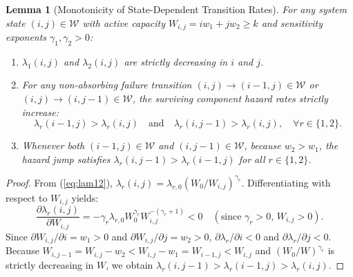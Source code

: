 \documentclass[10pt,a4paper]{article}
\newtheorem{lemma}{Lemma}
\begin{document}
\begin{lemma}[Monotonicity of State-Dependent Transition Rates]
For any system state $(i, j) \in \mathcal{W}$ with active capacity $W_{i,j} = i w_1 + j w_2 \ge k$ and sensitivity exponents $\gamma_1, \gamma_2 > 0$:
\begin{enumerate}
    \item $\lambda_1(i, j)$ and $\lambda_2(i, j)$ are strictly decreasing in $i$ and $j$.
    \item For any non-absorbing failure transition $(i, j) \to (i - 1, j) \in \mathcal{W}$ or $(i, j) \to (i, j - 1) \in \mathcal{W}$, the surviving component hazard rates strictly increase:
    $$\lambda_r(i - 1, j) > \lambda_r(i, j) \quad \text{and} \quad \lambda_r(i, j - 1) > \lambda_r(i, j), \quad \forall r \in \{1, 2\}.$$
    \item Whenever both $(i - 1, j) \in \mathcal{W}$ and $(i, j - 1) \in \mathcal{W}$, because $w_2 > w_1$, the hazard jump satisfies $\lambda_r(i, j - 1) > \lambda_r(i - 1, j)$ for all $r \in \{1, 2\}$.
\end{enumerate}
\end{lemma}

\begin{proof}
From (\ref{eq:lam12}), $\lambda_r(i, j) = \lambda_{r,0} (W_0 / W_{i,j})^{\gamma_r}$. Differentiating with respect to $W_{i,j}$ yields:
$$\frac{\partial \lambda_r(i, j)}{\partial W_{i,j}} = -\gamma_r \lambda_{r,0} W_0^{\gamma_r} W_{i,j}^{-(\gamma_r + 1)} < 0 \quad (\text{since } \gamma_r > 0, \, W_{i,j} > 0).$$
Since $\partial W_{i,j} / \partial i = w_1 > 0$ and $\partial W_{i,j} / \partial j = w_2 > 0$, $\partial \lambda_r / \partial i < 0$ and $\partial \lambda_r / \partial j < 0$. Because $W_{i, j-1} = W_{i,j} - w_2 < W_{i,j} - w_1 = W_{i-1, j} < W_{i,j}$ and $(W_0 / W)^{\gamma_r}$ is strictly decreasing in $W$, we obtain $\lambda_r(i, j - 1) > \lambda_r(i - 1, j) > \lambda_r(i, j)$.
\end{proof}
\end{document}
